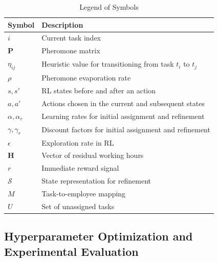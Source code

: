 \documentclass[%
aip,
cp,  %
reprint
]{revtex4-2}
\begin{document}
	\begin{table}[!ht]
		\caption{\label{tab:legend}Legend of Symbols}
		\begin{ruledtabular}
			\begin{tabular}{ll}
				\textbf{Symbol}    & \textbf{Description}                                       \\
				\hline
				$i$                & Current task index                                         \\
				$\mathbf{P}$       & Pheromone matrix                                           \\
				$\eta_{ij}$        & Heuristic value for transitioning from task $t_i$ to $t_j$ \\
				$\rho$             & Pheromone evaporation rate                                 \\
				$s, s'$            & RL states before and after an action                       \\
				$a, a'$            & Actions chosen in the current and subsequent states        \\
				$\alpha, \alpha_r$ & Learning rates for initial assignment and refinement       \\
				$\gamma, \gamma_r$ & Discount factors for initial assignment and refinement     \\
				$\epsilon$         & Exploration rate in RL                                     \\
				$\mathbf{H}$       & Vector of residual working hours                           \\
				$r$                & Immediate reward signal                                    \\
				$\mathcal{S}$      & State representation for refinement                        \\
				$M$                & Task-to-employee mapping                                   \\
				$U$                & Set of unassigned tasks                                    \\
			\end{tabular}
		\end{ruledtabular}
	\end{table}
	
	
	\subsection{\label{subsec:hyperparameter}Hyperparameter Optimization and Experimental Evaluation}
	
\end{document}
